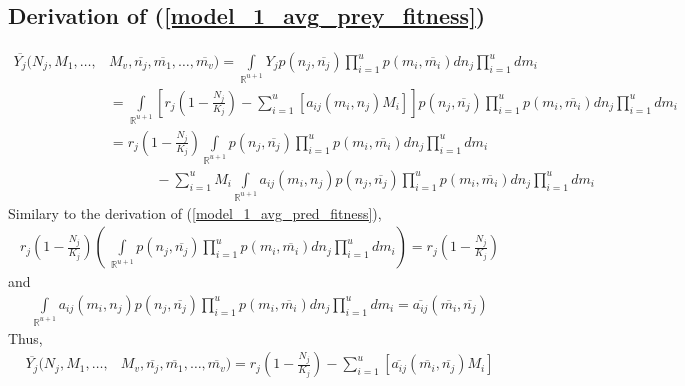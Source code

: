 \documentclass{amsart}
\theoremstyle{definition}
\theoremstyle{remark}
\numberwithin{equation}{section}
\begin{document}
\subsection*{Derivation of (\ref{model_1_avg_prey_fitness})}
\begin{align*}
	\overline{Y_j}(N_j, M_1, \dots, &M_v, \overline{n_j}, \overline{m_1}, \dots, \overline{m_v}) = \int\limits_{\mathbb{R}^{u+1}}^{}Y_jp(n_j, \overline{n_j})\prod\limits_{i = 1}^{u}p(m_i, \overline{m_i})dn_j\prod\limits_{i = 1}^{u}dm_i \\
	&= \int\limits_{\mathbb{R}^{u+1}}\left[r_j\left(1 - \frac{N_j}{K_j}\right) - \sum\limits_{i = 1}^{u}\left[a_{ij}(m_i, n_j)M_i\right]\right]p(n_j, \overline{n_j})\prod\limits_{i = 1}^{u}p(m_i, \overline{m_i})dn_j\prod\limits_{i = 1}^{u}dm_i \\
	&= r_j\left(1 - \frac{N_j}{K_j}\right)\int\limits_{\mathbb{R}^{u+1}}p(n_j, \overline{n_j})\prod\limits_{i = 1}^{u}p(m_i, \overline{m_i})dn_j\prod\limits_{i = 1}^{u}dm_i \\
	&\ \ \ \ \ \ \ \ \ \ \ \ \ \ \ - \sum\limits_{i=1}^{u}M_i\int\limits_{\mathbb{R}^{u+1}}a_{ij}(m_i, n_j)p(n_j, \overline{n_j})\prod\limits_{i = 1}^{u}p(m_i, \overline{m_i})dn_j\prod\limits_{i = 1}^{u}dm_i
\end{align*}
Similary to the derivation of (\ref{model_1_avg_pred_fitness}),
\begin{align*}
	r_j\left(1 - \frac{N_j}{K_j}\right)\left(\ \int\limits_{\mathbb{R}^{u+1}}p(n_j, \overline{n_j})\prod\limits_{i = 1}^{u}p(m_i, \overline{m_i})dn_j\prod\limits_{i = 1}^{u}dm_i\right) = r_j\left(1 - \frac{N_j}{K_j}\right)
\end{align*}
and
\begin{align*}
	\int\limits_{\mathbb{R}^{u+1}}a_{ij}(m_i, n_j)p(n_j, \overline{n_j})\prod\limits_{i = 1}^{u}p(m_i, \overline{m_i})dn_j\prod\limits_{i = 1}^{u}dm_i = \overline{a_{ij}}(\overline{m_i}, \overline{n_j})
\end{align*}
Thus,
\begin{align*}
	\overline{Y_j}(N_j, M_1, \dots, &M_v, \overline{n_j}, \overline{m_1}, \dots, \overline{m_v}) = r_j\left(1 - \frac{N_j}{K_j}\right) - \sum\limits_{i = 1}^{u}\left[\overline{a_{ij}}(\overline{m_i}, \overline{n_j})M_i\right]
\end{align*}
\end{document}
